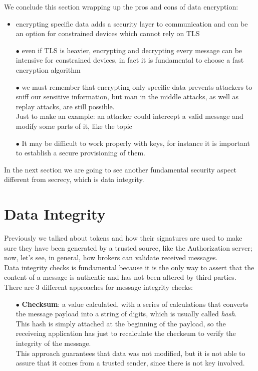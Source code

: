 \documentclass[12pt]{report}
\begin{document}
{We conclude this section wrapping up the pros and cons of data encryption:

\begin{itemize}
\setlength{\itemindent}{+4mm}
\item encrypting specific data adds a security layer to communication and can be an option for constrained devices which cannot rely on TLS
\item[$\bullet$] even if TLS is heavier, encrypting and decrypting every message can be intensive for constrained devices, in fact it is fundamental to choose a fast encryption algorithm
\item[$\bullet$] we must remember that encrypting only specific data prevents attackers to sniff our sensitive information, but man in the middle attacks, as well as replay attacks, are still possible.\\ 
Just to make an example: an attacker could intercept a valid message and modify some parts of it, like the topic
\item[$\bullet$] It may be difficult to work properly with keys, for instance it is important to establish a secure provisioning of them.
\end{itemize}
\bigskip
In the next section we are going to see another fundamental security aspect different from secrecy, which is data integrity.\\

\section{Data Integrity}
\bigskip

Previously we talked about tokens and how their signatures are used to make sure they have been generated by a trusted source, like the Authorization server; now, let's see, in general, how brokers can validate received messages.\\
Data integrity checks is fundamental because it is the only way to assert that the content of a message is authentic and has not been altered by third parties.\\
There are 3 different approaches for message integrity checks:

\begin{itemize}
\setlength{\itemindent}{+4mm}
\item[$\bullet$] \textbf{Checksum}: a value calculated, with a series of calculations that converts the message payload into a string of digits, which is usually called \textit{hash}.\\
This hash is simply attached at the beginning of the payload, so the receiveing application has just to recalculate the checksum to verify the integrity of the message.\\
This approach guarantees that data was not modified, but it is not able to assure that it comes from a trusted sender, since there is not key involved.


\end{itemize}}
\end{document}
